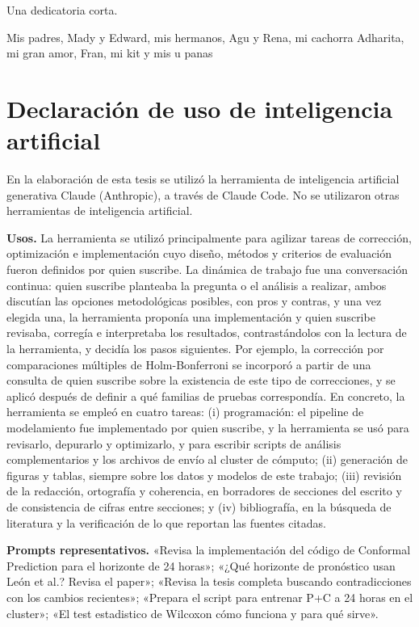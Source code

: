 \documentclass{umemoria}
\begin{document}
\begin{dedicatoria}
Una dedicatoria corta.
\end{dedicatoria}

\begin{thanks}
Mis padres, Mady y Edward, mis hermanos, Agu y Rena, mi cachorra Adharita, mi gran amor, Fran, mi kit y mis u panas
\end{thanks}

\chapter*{Declaración de uso de inteligencia artificial}
\enlargethispage{3\baselineskip}

En la elaboración de esta tesis se utilizó la herramienta de inteligencia artificial generativa Claude (Anthropic), a través de Claude Code. No se utilizaron otras herramientas de inteligencia artificial.

\textbf{Usos.} La herramienta se utilizó principalmente para agilizar tareas de corrección, optimización e implementación cuyo diseño, métodos y criterios de evaluación fueron definidos por quien suscribe. La dinámica de trabajo fue una conversación continua: quien suscribe planteaba la pregunta o el análisis a realizar, ambos discutían las opciones metodológicas posibles, con pros y contras, y una vez elegida una, la herramienta proponía una implementación y quien suscribe revisaba, corregía e interpretaba los resultados, contrastándolos con la lectura de la herramienta, y decidía los pasos siguientes. Por ejemplo, la corrección por comparaciones múltiples de Holm-Bonferroni se incorporó a partir de una consulta de quien suscribe sobre la existencia de este tipo de correcciones, y se aplicó después de definir a qué familias de pruebas correspondía. En concreto, la herramienta se empleó en cuatro tareas: (i) programación: el pipeline de modelamiento fue implementado por quien suscribe, y la herramienta se usó para revisarlo, depurarlo y optimizarlo, y para escribir scripts de análisis complementarios y los archivos de envío al cluster de cómputo; (ii) generación de figuras y tablas, siempre sobre los datos y modelos de este trabajo; (iii) revisión de la redacción, ortografía y coherencia, en borradores de secciones del escrito y de consistencia de cifras entre secciones; y (iv) bibliografía, en la búsqueda de literatura y la verificación de lo que reportan las fuentes citadas.

\textbf{Prompts representativos.} «Revisa la implementación del código de Conformal Prediction para el horizonte de 24 horas»; «¿Qué horizonte de pronóstico usan León et al.? Revisa el paper»; «Revisa la tesis completa buscando contradicciones con los cambios recientes»; «Prepara el script para entrenar P+C a 24 horas en el cluster»; «El test estadistico de Wilcoxon cómo funciona y para qué sirve».
\end{document}
